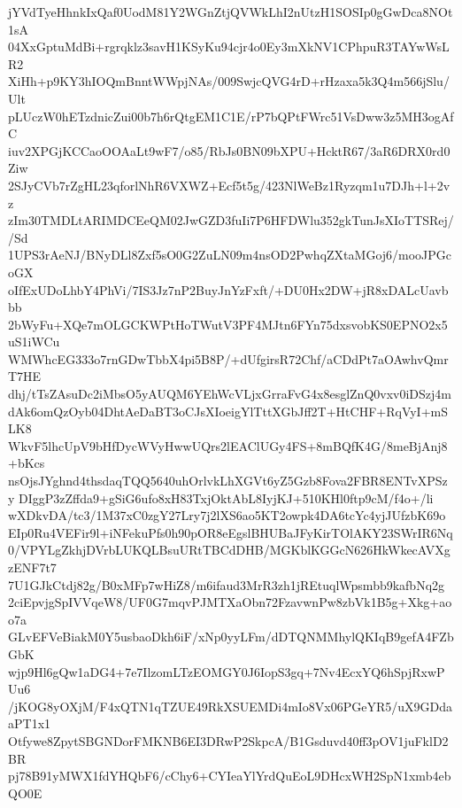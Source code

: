 jYVdTyeHhnkIxQaf0UodM81Y2WGnZtjQVWkLhI2nUtzH1SOSIp0gGwDca8NOt1sA
04XxGptuMdBi+rgrqklz3savH1KSyKu94cjr4o0Ey3mXkNV1CPhpuR3TAYwWsLR2
XiHh+p9KY3hIOQmBnntWWpjNAs/009SwjcQVG4rD+rHzaxa5k3Q4m566jSlu/Ult
pLUczW0hETzdnicZui00b7h6rQtgEM1C1E/rP7bQPtFWrc51VsDww3z5MH3ogAfC
iuv2XPGjKCCaoOOAaLt9wF7/o85/RbJs0BN09bXPU+HcktR67/3aR6DRX0rd0Ziw
2SJyCVb7rZgHL23qforlNhR6VXWZ+Ecf5t5g/423NlWeBz1Ryzqm1u7DJh+l+2vz
zIm30TMDLtARIMDCEeQM02JwGZD3fuIi7P6HFDWlu352gkTunJsXIoTTSRej//Sd
1UPS3rAeNJ/BNyDLl8Zxf5sO0G2ZuLN09m4nsOD2PwhqZXtaMGoj6/mooJPGcoGX
oIfExUDoLhbY4PhVi/7IS3Jz7nP2BuyJnYzFxft/+DU0Hx2DW+jR8xDALcUavbbb
2bWyFu+XQe7mOLGCKWPtHoTWutV3PF4MJtn6FYn75dxsvobKS0EPNO2x5uS1iWCu
WMWhcEG333o7rnGDwTbbX4pi5B8P/+dUfgirsR72Chf/aCDdPt7aOAwhvQmrT7HE
dhj/tTsZAsuDc2iMbsO5yAUQM6YEhWcVLjxGrraFvG4x8esglZnQ0vxv0iDSzj4m
dAk6omQzOyb04DhtAeDaBT3oCJsXIoeigYlTttXGbJff2T+HtCHF+RqVyI+mSLK8
WkvF5lhcUpV9bHfDycWVyHwwUQrs2lEAClUGy4FS+8mBQfK4G/8meBjAnj8+bKcs
nsOjsJYghnd4thsdaqTQQ5640uhOrlvkLhXGVt6yZ5Gzb8Fova2FBR8ENTvXPSzy
DIggP3zZffda9+gSiG6ufo8xH83TxjOktAbL8IyjKJ+510KHl0ftp9cM/f4o+/li
wXDkvDA/tc3/1M37xC0zgY27Lry7j2lXS6ao5KT2owpk4DA6tcYc4yjJUfzbK69o
EIp0Ru4VEFir9l+iNFekuPfs0h90pOR8eEgslBHUBaJFyKirTOlAKY23SWrIR6Nq
0/VPYLgZkhjDVrbLUKQLBsuURtTBCdDHB/MGKblKGGcN626HkWkecAVXgzENF7t7
7U1GJkCtdj82g/B0xMFp7wHiZ8/m6ifaud3MrR3zh1jREtuqlWpsmbb9kafbNq2g
2ciEpvjgSpIVVqeW8/UF0G7mqvPJMTXaObn72FzavwnPw8zbVk1B5g+Xkg+aoo7a
GLvEFVeBiakM0Y5usbaoDkh6iF/xNp0yyLFm/dDTQNMMhylQKIqB9gefA4FZbGbK
wjp9Hl6gQw1aDG4+7e7IlzomLTzEOMGY0J6IopS3gq+7Nv4EcxYQ6hSpjRxwPUu6
/jKOG8yOXjM/F4xQTN1qTZUE49RkXSUEMDi4mIo8Vx06PGeYR5/uX9GDdaaPT1x1
Otfywe8ZpytSBGNDorFMKNB6EI3DRwP2SkpcA/B1Gsduvd40ff3pOV1juFklD2BR
pj78B91yMWX1fdYHQbF6/cChy6+CYIeaYlYrdQuEoL9DHcxWH2SpN1xmb4ebQO0E
